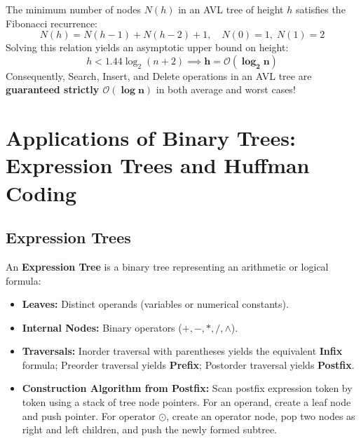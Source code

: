 \documentclass[12pt,a4paper]{article}
\begin{document}
\begin{tcolorbox}[formulabox, title={\textbf{Height Bound and Complexity of AVL Trees}}]
The minimum number of nodes $N(h)$ in an AVL tree of height $h$ satisfies the Fibonacci recurrence:
\begin{equation}
  N(h) = N(h-1) + N(h-2) + 1, \quad N(0) = 1, \; N(1) = 2
\end{equation}
Solving this relation yields an asymptotic upper bound on height:
\begin{equation}
  h < 1.44 \log_2(n + 2) \implies \mathbf{h = \mathcal{O}(\log_2 n)}
\end{equation}
Consequently, Search, Insert, and Delete operations in an AVL tree are \textbf{guaranteed strictly $\mathbf{\mathcal{O}(\log n)}$} in both average and worst cases!
\end{tcolorbox}

\section{Applications of Binary Trees: Expression Trees and Huffman Coding}

\subsection{Expression Trees}
An \textbf{Expression Tree} is a binary tree representing an arithmetic or logical formula:
\begin{itemize}[leftmargin=*, nosep]
  \item \textbf{Leaves:} Distinct operands (variables or numerical constants).
  \item \textbf{Internal Nodes:} Binary operators ($+, -, *, /, \wedge$).
  \item \textbf{Traversals:} Inorder traversal with parentheses yields the equivalent \textbf{Infix} formula; Preorder traversal yields \textbf{Prefix}; Postorder traversal yields \textbf{Postfix}.
  \item \textbf{Construction Algorithm from Postfix:} Scan postfix expression token by token using a stack of tree node pointers. For an operand, create a leaf node and push pointer. For operator $\odot$, create an operator node, pop two nodes as right and left children, and push the newly formed subtree.
\end{itemize}
\end{document}

